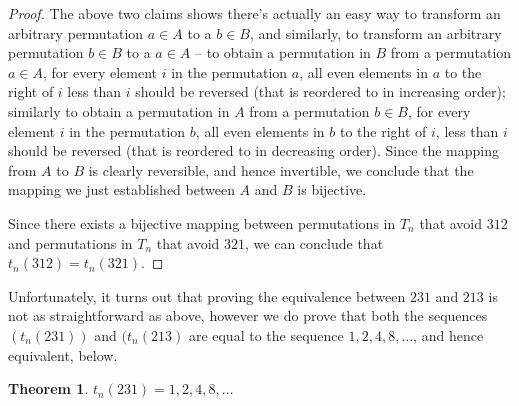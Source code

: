 \documentclass[11pt,letterpaper,twoside,english]{article}
\theoremstyle{theorem}
\newtheorem{theorem}{Theorem}
\theoremstyle{remark}
\begin{document}
\begin{proof}
The above two claims shows there's actually an easy way to transform an arbitrary permutation $a \in A$ to a $b \in B$, and similarly, to transform an arbitrary permutation $b \in B$ to a $a \in A$ -- to obtain a permutation in $B$ from a permutation $a \in A$, for every element $i$ in the permutation $a$, all even elements in $a$ to the right of $i$ less than $i$ should be reversed (that is reordered to in increasing order); similarly to obtain a permutation in $A$ from a permutation $b \in B$, for every element $i$ in the permutation $b$, all even elements in $b$ to the right of $i$, less than $i$ should be reversed (that is reordered to in decreasing order). Since the mapping from $A$ to $B$ is clearly reversible, and hence invertible, we conclude that the mapping we just established between $A$ and $B$ is bijective.

Since there exists a bijective mapping between permutations in $T_n$ that avoid $312$ and permutations in $T_n$ that avoid $321$, we can conclude that $t_n(312) = t_n(321)$.

\end{proof}

Unfortunately, it turns out that proving the equivalence between $231$ and $213$ is not as straightforward as above, however we do prove that both the sequences $(t_n(231))$ and $(t_n(213)$ are equal to the sequence $1, 2, 4, 8, \ldots$, and hence equivalent, below.

\begin{theorem}
$t_n(231) = 1, 2, 4, 8, \ldots$
\end{theorem}
\end{document}
